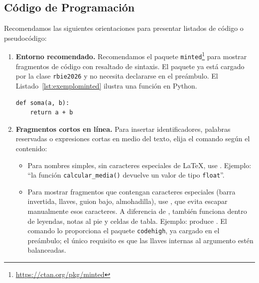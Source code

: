 \documentclass[spanish]{rbie2026}%
\begin{document}
\subsection{Código de Programación}

Recomendamos las siguientes orientaciones para presentar listados de código o pseudocódigo:

\begin{enumerate}

  \item \textbf{Entorno recomendado.} Recomendamos el paquete \texttt{minted}\footnote{\url{https://ctan.org/pkg/minted}} para mostrar fragmentos de código con resaltado de sintaxis. El paquete ya está cargado por la clase \texttt{rbie2026} y no necesita declararse en el preámbulo. El Listado~\ref{lst:exemplominted} ilustra una función en Python.


\begin{listing}[H]
    \caption{Ejemplo de código formateado con el paquete \texttt{minted}.}
    \label{lst:exemplominted}
    \begin{verbatim}
def soma(a, b):
    return a + b
    \end{verbatim}
    \vspace{-12pt} %
\end{listing}

  \item \textbf{Fragmentos cortos en línea.} Para insertar identificadores, palabras reservadas o expresiones cortas en medio del texto, elija el comando según el contenido:

  \begin{itemize}
    \item Para nombres simples, sin caracteres especiales de \LaTeX, use . Ejemplo: ``la función \texttt{calcular\_media()} devuelve un valor de tipo \texttt{float}''.

    \item Para mostrar fragmentos que contengan caracteres especiales (barra invertida, llaves, guion bajo, almohadilla), use , que evita escapar manualmente esos caracteres. A diferencia de \fakeverb{\verb||}, también funciona dentro de leyendas, notas al pie y celdas de tabla. Ejemplo:  produce . El comando lo proporciona el paquete \texttt{codehigh}, ya cargado en el preámbulo; el único requisito es que las llaves internas al argumento estén balanceadas.
  \end{itemize}


\end{enumerate}
\end{document}
